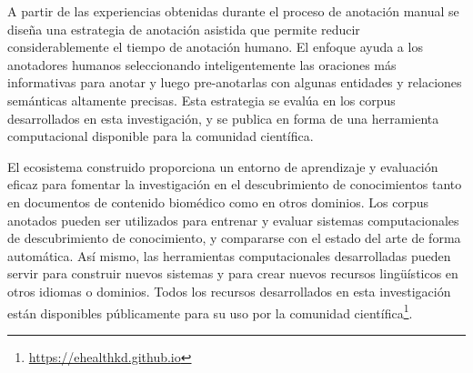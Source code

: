 A partir de las experiencias obtenidas durante el proceso de anotación manual se diseña una estrategia de anotación asistida que permite reducir considerablemente el tiempo de anotación humano.
El enfoque ayuda a los anotadores humanos seleccionando inteligentemente las oraciones más informativas para anotar y luego pre-anotarlas con algunas entidades y relaciones semánticas altamente precisas.
Esta estrategia se evalúa en los corpus desarrollados en esta investigación, y se publica en forma de una herramienta computacional disponible para la comunidad científica.

El ecosistema construido proporciona un entorno de aprendizaje y evaluación eficaz para fomentar la investigación en el descubrimiento de conocimientos tanto en documentos de contenido biomédico como en otros dominios. Los corpus anotados pueden ser utilizados para entrenar y evaluar sistemas computacionales de descubrimiento de conocimiento, y compararse con el estado del arte de forma automática. Así mismo, las herramientas computacionales desarrolladas pueden servir para construir nuevos sistemas y para crear nuevos recursos lingüísticos en otros idiomas o dominios. Todos los recursos desarrollados en esta investigación están disponibles públicamente para su uso por la comunidad científica\footnote{\url{https://ehealthkd.github.io}}.
